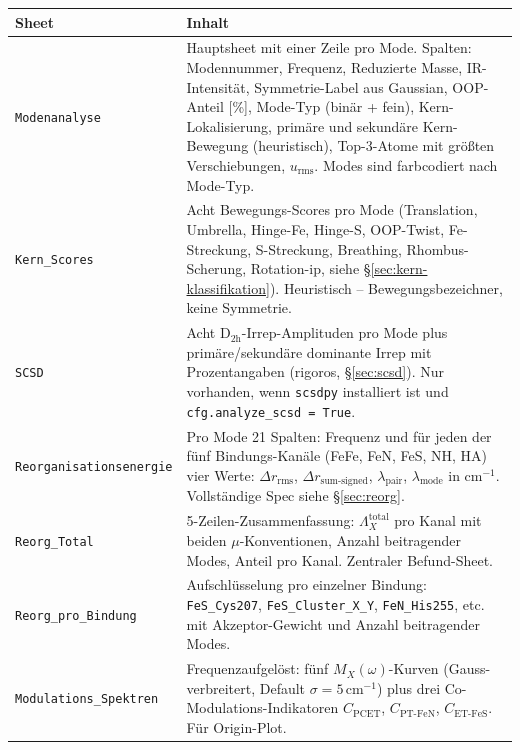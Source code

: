 \documentclass[11pt,a4paper,twoside]{article}
\theoremstyle{remark}
\begin{document}
\begin{longtable}{p{} p{}}
\toprule
\textbf{Sheet} & \textbf{Inhalt} \\
\midrule
\endhead

\texttt{Modenanalyse} & Hauptsheet mit einer Zeile pro Mode. Spalten:
  Modennummer, Frequenz, Reduzierte Masse, IR-Intensit\"at,
  Symmetrie-Label aus Gaussian, OOP-Anteil [\%], Mode-Typ (bin\"ar +
  fein), Kern-Lokalisierung, prim\"are und sekund\"are Kern-Bewegung
  (heuristisch), Top-3-Atome mit gr\"o\ss ten Verschiebungen, $u_\text{rms}$.
  Modes sind farbcodiert nach Mode-Typ. \\

\texttt{Kern\_Scores} & Acht Bewegungs-Scores pro Mode (Translation,
  Umbrella, Hinge-Fe, Hinge-S, OOP-Twist, Fe-Streckung, S-Streckung,
  Breathing, Rhombus-Scherung, Rotation-ip, siehe
  \S\ref{sec:kern-klassifikation}). Heuristisch -- Bewegungsbezeichner,
  keine Symmetrie. \\

\texttt{SCSD} & Acht D$_\mathrm{2h}$-Irrep-Amplituden pro Mode plus
  prim\"are/sekund\"are dominante Irrep mit Prozentangaben (rigoros,
  \S\ref{sec:scsd}). Nur vorhanden, wenn \texttt{scsdpy} installiert
  ist und \texttt{cfg.analyze\_scsd = True}. \\

\texttt{Reorganisationsenergie} & Pro Mode 21 Spalten: Frequenz und
  f\"ur jeden der f\"unf Bindungs-Kan\"ale (FeFe, FeN, FeS, NH, HA)
  vier Werte: $\Delta r_\text{rms}$, $\Delta r_\text{sum-signed}$,
  $\lambda_\text{pair}$, $\lambda_\text{mode}$ in cm$^{-1}$.
  Vollst\"andige Spec siehe \S\ref{sec:reorg}. \\

\texttt{Reorg\_Total} & 5-Zeilen-Zusammenfassung:
  $\Lambda_X^\text{total}$ pro Kanal mit beiden $\mu$-Konventionen,
  Anzahl beitragender Modes, Anteil pro Kanal. Zentraler Befund-Sheet. \\

\texttt{Reorg\_pro\_Bindung} & Aufschl\"usselung pro einzelner
  Bindung: \texttt{FeS\_Cys207}, \texttt{FeS\_Cluster\_X\_Y},
  \texttt{FeN\_His255}, etc. mit Akzeptor-Gewicht und Anzahl
  beitragender Modes. \\

\texttt{Modulations\_Spektren} & Frequenzaufgel\"ost: f\"unf
  $M_X(\omega)$-Kurven (Gauss-verbreitert, Default $\sigma = 5$\,cm$^{-1}$)
  plus drei Co-Modulations-Indikatoren $C_\text{PCET}$,
  $C_\text{PT-FeN}$, $C_\text{ET-FeS}$. F\"ur Origin-Plot. \\


\end{longtable}
\end{document}
